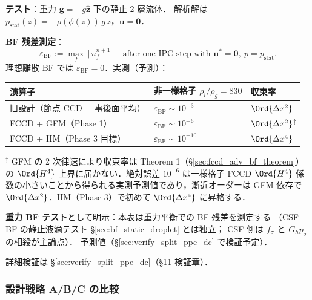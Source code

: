 \noindent\textbf{テスト}：重力 $\mathbf{g}=-g\hat{\mathbf{z}}$ 下の静止 2 層流体．
解析解は $p_\text{stat}(z) = -\rho(\phi(z))\,g\,z$，$\mathbf{u}=\mathbf{0}$．

\noindent\textbf{BF 残差測定}：
\begin{equation}
  \varepsilon_\text{BF}
    := \max_f\,\bigl|\,u_f^{n+1}\,\bigr|
    \quad\text{after one IPC step with }\mathbf{u}^*=\mathbf{0},\ p=p_\text{stat}.
  \label{eq:fccd_bf_hydrostatic_metric}
\end{equation}
理想離散 BF では $\varepsilon_\text{BF}=0$．実測（予測）：
\begin{center}
\begin{tabular}{@{}lll@{}}
\hline
演算子 & 非一様格子 $\rho_l/\rho_g=830$ & 収束率 \\
\hline
旧設計（節点 CCD + 事後面平均）& $\varepsilon_\text{BF}\sim 10^{-3}$ & $\Ord{\Delta x^2}$ \\
FCCD + GFM（Phase 1）& $\varepsilon_\text{BF}\sim 10^{-6}$ & $\Ord{\Delta x^2}$$^{\ddagger}$ \\
FCCD + IIM（Phase 3 目標）& $\varepsilon_\text{BF}\sim 10^{-10}$ & $\Ord{\Delta x^4}$ \\
\hline
\end{tabular}
\end{center}
\noindent$^{\ddagger}$ GFM の 2 次律速により収束率は Theorem 1（\S\ref{sec:fccd_adv_bf_theorem}）
の $\Ord{H^4}$ 上界に届かない．絶対誤差 $10^{-6}$ は一様格子 FCCD $\Ord{H^4}$
係数の小さいことから得られる実測予測値であり，漸近オーダーは GFM 依存で
$\Ord{\Delta x^2}$．IIM（Phase 3）で初めて $\Ord{\Delta x^4}$ に昇格する．

\noindent\textbf{重力 BF テスト}として明示：本表は重力平衡での BF 残差を測定する
（CSF BF の静止液滴テスト \S\ref{sec:bf_static_droplet} とは独立；
CSF 側は $f_\sigma$ と $G_h p_\sigma$ の相殺が主論点）．
予測値（§\ref{sec:verify_split_ppe_dc} で検証予定）．

詳細検証は \S\ref{sec:verify_split_ppe_dc}（§11 検証章）．

\subsubsection{設計戦略 A/B/C の比較}
\label{sec:fccd_bf_strategy_table}

